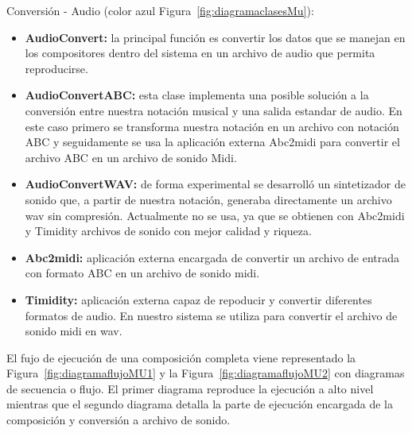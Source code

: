 Conversión - Audio (color azul Figura~\ref{fig:diagramaclasesMu}):

\begin{itemize}
	
	\item \textbf{AudioConvert:} la principal función es convertir los datos que se manejan en los compositores dentro del sistema en un archivo de audio que permita reproducirse.

	\item \textbf{AudioConvertABC:} esta clase implementa una posible solución a la conversión entre nuestra notación musical y una salida estandar de audio. En este caso primero se transforma nuestra notación en un archivo con notación ABC y seguidamente se usa la aplicación externa Abc2midi para convertir el archivo ABC en un archivo de sonido Midi.

	\item \textbf{AudioConvertWAV:} de forma experimental se desarrolló un sintetizador de sonido que, a partir de nuestra notación, generaba directamente un archivo wav sin compresión. Actualmente no se usa, ya que se obtienen con Abc2midi y Timidity archivos de sonido con mejor calidad y riqueza.

	\item \textbf{Abc2midi:} aplicación externa encargada de convertir un archivo de entrada con formato ABC en un archivo de sonido midi.

	\item \textbf{Timidity:} aplicación externa capaz de repoducir y convertir diferentes formatos de audio. En nuestro sistema se utiliza para convertir el archivo de sonido midi en wav.

\end{itemize}
	
El fujo de ejecución de una composición completa viene representado la Figura~\ref{fig:diagramaflujoMU1} y la Figura~\ref{fig:diagramaflujoMU2} con diagramas de secuencia o flujo. El primer diagrama reproduce la ejecución a alto nivel mientras que el segundo diagrama detalla la parte de ejecución encargada de la composición y conversión a archivo de sonido.

